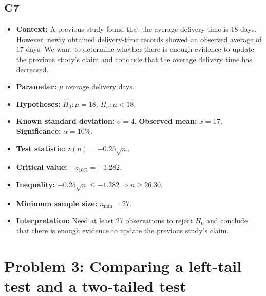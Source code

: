 \subsection*{C7}
\begin{itemize}
	\item \textbf{Context:} A previous study found that the average delivery time is \(18\) days. However, newly obtained delivery-time records showed an observed average of \(17\) days. We want to determine whether there is enough evidence to update the previous study's claim and conclude that the average delivery time has decreased.
	\item \textbf{Parameter:} \(\mu\) average delivery days.
	\item \textbf{Hypotheses:} \(H_0:\mu=18\), \(H_a:\mu<18\).
	\item \textbf{Known standard deviation:} \(\sigma=4\), \textbf{Observed mean:} \(\bar x=17\), \textbf{Significance:} \(\alpha=10\%\).
	\item \textbf{Test statistic:} \(z(n)=-0.25\sqrt n\).
	\item \textbf{Critical value:} \(-z_{10\%}=-1.282\).
	\item \textbf{Inequality:} \(-0.25\sqrt n\le-1.282\Rightarrow n\ge26.30\).
	\item \textbf{Minimum sample size:} \(n_{\min}=27\).
	\item \textbf{Interpretation:} Need at least 27 observations to reject \(H_0\) and conclude that there is enough evidence to update the previous study's claim.
\end{itemize}

\section{Problem 3: Comparing a left-tail test and a two-tailed test}
